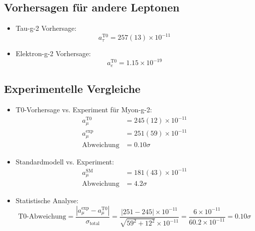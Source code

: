\documentclass[12pt,a4paper]{article}
\begin{document}
\subsection{Vorhersagen für andere Leptonen}
\begin{itemize}
	\item Tau-g-2 Vorhersage:
	\begin{equation}
		a_\tau^{\text{T0}} = 257(13) \times 10^{-11}
	\end{equation}
	
	\item Elektron-g-2 Vorhersage:
	\begin{equation}
		a_e^{\text{T0}} = 1.15 \times 10^{-19}
	\end{equation}
\end{itemize}

\subsection{Experimentelle Vergleiche}
\begin{itemize}
	\item T0-Vorhersage vs. Experiment für Myon-g-2:
	\begin{align}
		a_\mu^{\text{T0}} &= 245(12) \times 10^{-11} \\
		a_\mu^{\text{exp}} &= 251(59) \times 10^{-11} \\
		\text{Abweichung} &= 0.10\sigma
	\end{align}
	
	\item Standardmodell vs. Experiment:
	\begin{align}
		a_\mu^{\text{SM}} &= 181(43) \times 10^{-11} \\
		\text{Abweichung} &= 4.2\sigma
	\end{align}
	
	\item Statistische Analyse:
	\begin{equation}
		\text{T0-Abweichung} = \frac{|a_\mu^{\text{exp}} - a_\mu^{\text{T0}}|}{\sigma_{\text{total}}} = \frac{|251 - 245| \times 10^{-11}}{\sqrt{59^2 + 12^2} \times 10^{-11}} = \frac{6 \times 10^{-11}}{60.2 \times 10^{-11}} = 0.10\sigma
	\end{equation}
\end{itemize}
\end{document}
